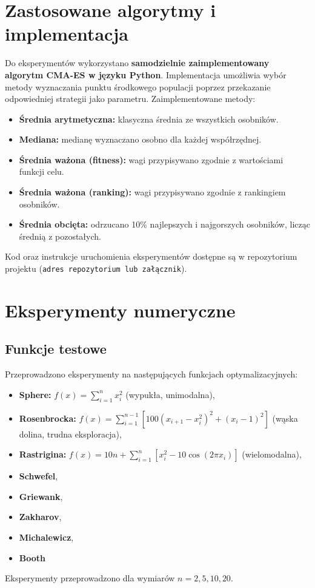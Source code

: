 \documentclass{article}
\begin{document}
\section{Zastosowane algorytmy i implementacja}
Do eksperymentów wykorzystano \textbf{samodzielnie zaimplementowany algorytm CMA-ES w języku Python}. Implementacja umożliwia wybór metody wyznaczania punktu środkowego populacji poprzez przekazanie odpowiedniej strategii jako parametru. Zaimplementowane metody:
\begin{itemize}
    \item \textbf{Średnia arytmetyczna:} klasyczna średnia ze wszystkich osobników.
    \item \textbf{Mediana:} medianę wyznaczano osobno dla każdej współrzędnej.
    \item \textbf{Średnia ważona (fitness):} wagi przypisywano zgodnie z wartościami funkcji celu.
    \item \textbf{Średnia ważona (ranking):} wagi przypisywano zgodnie z rankingiem osobników.
    \item \textbf{Średnia obcięta:} odrzucano 10\% najlepszych i najgorszych osobników, licząc średnią z pozostałych.
\end{itemize}
Kod oraz instrukcje uruchomienia eksperymentów dostępne są w repozytorium projektu (\texttt{adres repozytorium lub załącznik}).

\section{Eksperymenty numeryczne}
\subsection{Funkcje testowe}
Przeprowadzono eksperymenty na następujących funkcjach optymalizacyjnych:
\begin{itemize}
    \item \textbf{Sphere:} $f(x) = \sum_{i=1}^n x_i^2$ (wypukła, unimodalna),
    \item \textbf{Rosenbrocka:} $f(x) = \sum_{i=1}^{n-1} [100(x_{i+1} - x_i^2)^2 + (x_i - 1)^2]$ (wąska dolina, trudna eksploracja),
    \item \textbf{Rastrigina:} $f(x) = 10n + \sum_{i=1}^n [x_i^2 - 10\cos(2\pi x_i)]$ (wielomodalna),
    \item \textbf{Schwefel},
    \item \textbf{Griewank},
    \item \textbf{Zakharov},
    \item \textbf{Michalewicz},
    \item \textbf{Booth}
\end{itemize}
Eksperymenty przeprowadzono dla wymiarów $n=2, 5, 10, 20$.
\end{document}
